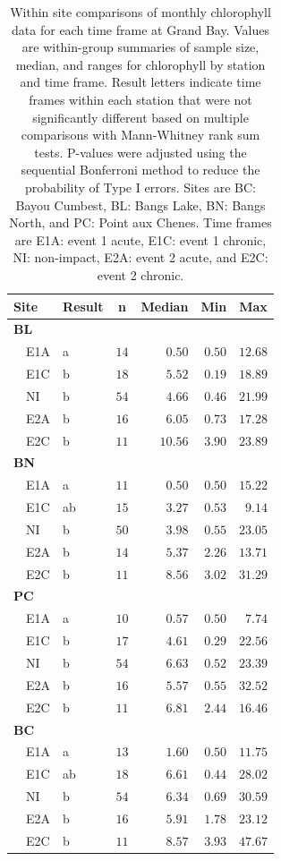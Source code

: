 \documentclass[letterpaper,12pt]{article}\usepackage[]{graphicx}\usepackage[]{color}
\begin{document}
\clearpage

\begin{table}[!tbp]
\caption{Within site comparisons  of monthly chlorophyll data for each time frame at Grand Bay.  Values are within-group summaries of sample size, median, and ranges for chlorophyll by station and time frame.  Result letters indicate time frames within each station that were not significantly different based on multiple comparisons with Mann-Whitney rank sum tests.  P-values were adjusted using the sequential Bonferroni method to reduce the probability of Type I errors. Sites are BC: Bayou Cumbest, BL: Bangs Lake, BN: Bangs North, and PC: Point aux Chenes.  Time frames are E1A: event 1 acute, E1C: event 1 chronic, NI: non-impact, E2A: event 2 acute, and E2C: event 2 chronic.\label{tab:chltab}} 
\begin{center}
\begin{tabular}{llrrrr}
\hline\hline
\multicolumn{1}{l}{Site}&\multicolumn{1}{c}{Result}&\multicolumn{1}{c}{n}&\multicolumn{1}{c}{Median}&\multicolumn{1}{c}{Min}&\multicolumn{1}{c}{Max}\tabularnewline
\hline
{\bfseries BL}&&&&&\tabularnewline
~~E1A&a&$14$&$ 0.50$&$0.50$&$12.68$\tabularnewline
~~E1C&b&$18$&$ 5.52$&$0.19$&$18.89$\tabularnewline
~~NI&b&$54$&$ 4.66$&$0.46$&$21.99$\tabularnewline
~~E2A&b&$16$&$ 6.05$&$0.73$&$17.28$\tabularnewline
~~E2C&b&$11$&$10.56$&$3.90$&$23.89$\tabularnewline
\hline
{\bfseries BN}&&&&&\tabularnewline
~~E1A&a&$11$&$ 0.50$&$0.50$&$15.22$\tabularnewline
~~E1C&ab&$15$&$ 3.27$&$0.53$&$ 9.14$\tabularnewline
~~NI&b&$50$&$ 3.98$&$0.55$&$23.05$\tabularnewline
~~E2A&b&$14$&$ 5.37$&$2.26$&$13.71$\tabularnewline
~~E2C&b&$11$&$ 8.56$&$3.02$&$31.29$\tabularnewline
\hline
{\bfseries PC}&&&&&\tabularnewline
~~E1A&a&$10$&$ 0.57$&$0.50$&$ 7.74$\tabularnewline
~~E1C&b&$17$&$ 4.61$&$0.29$&$22.56$\tabularnewline
~~NI&b&$54$&$ 6.63$&$0.52$&$23.39$\tabularnewline
~~E2A&b&$16$&$ 5.57$&$0.55$&$32.52$\tabularnewline
~~E2C&b&$11$&$ 6.81$&$2.44$&$16.46$\tabularnewline
\hline
{\bfseries BC}&&&&&\tabularnewline
~~E1A&a&$13$&$ 1.60$&$0.50$&$11.75$\tabularnewline
~~E1C&ab&$18$&$ 6.61$&$0.44$&$28.02$\tabularnewline
~~NI&b&$54$&$ 6.34$&$0.69$&$30.59$\tabularnewline
~~E2A&b&$16$&$ 5.91$&$1.78$&$23.12$\tabularnewline
~~E2C&b&$11$&$ 8.57$&$3.93$&$47.67$\tabularnewline
\hline
\end{tabular}\end{center}

\end{table}
\end{document}
